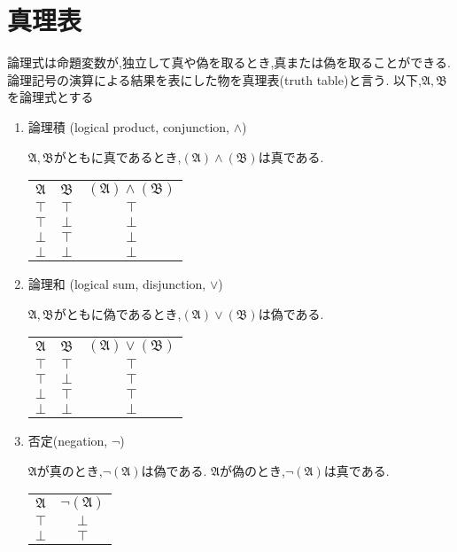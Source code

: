 \section{真理表}
論理式は命題変数が,独立して真や偽を取るとき,真または偽を取ることができる.
論理記号の演算による結果を表にした物を真理表(truth table)と言う.
以下,$\mathfrak{A},\mathfrak{B}$を論理式とする
\begin{enumerate}
 \item 論理積 (logical product, conjunction, $\land$)

   $\mathfrak{A},\mathfrak{B}$がともに真であるとき,$(\mathfrak{A}) \land (\mathfrak{B})$は真である.

	   \begin{tabular}{|c c||c|}
		\hline
		$\mathfrak{A}$    & $\mathfrak{B}$    & $(\mathfrak{A}) \land (\mathfrak{B})$ \\
		\hhline{|==#=|}
		$\top$ & $\top$ & $\top$ \\
		\hline
		$\top$ & $\bot$ & $\bot$ \\
		\hline
		$\bot$ & $\top$ & $\bot$ \\
		\hline
		$\bot$ & $\bot$ & $\bot$ \\
		\hline
	   \end{tabular}

 \item 論理和 (logical sum, disjunction, $\lor$)

	   $\mathfrak{A},\mathfrak{B}$がともに偽であるとき,$(\mathfrak{A}) \lor (\mathfrak{B})$は偽である.

	   \begin{tabular}{|c c||c|}
		\hline
		$\mathfrak{A}$    & $\mathfrak{B}$    & $(\mathfrak{A}) \lor (\mathfrak{B})$ \\
		\hhline{|==#=|}
		$\top$ & $\top$ & $\top$ \\
		\hline
		$\top$ & $\bot$ & $\top$ \\
		\hline
		$\bot$ & $\top$ & $\top$ \\
		\hline
		$\bot$ & $\bot$ & $\bot$ \\
		\hline
	   \end{tabular}

 \item 否定(negation, $\lnot$)

	   $\mathfrak{A}$が真のとき,$\lnot (\mathfrak{A})$は偽である.
	   $\mathfrak{A}$が偽のとき,$\lnot (\mathfrak{A})$は真である.

	   \begin{tabular}{|c||c|}
		\hline
		$\mathfrak{A}$    & $\lnot (\mathfrak{A}) $ \\
		\hhline{|=#=|}
		$\top$ & $\bot$ \\
		\hline
		$\bot$ & $\top$ \\
		\hline
	   \end{tabular}


\end{enumerate}
